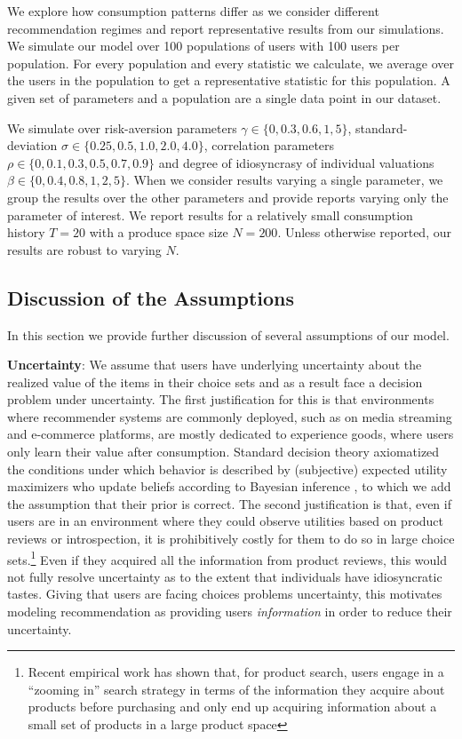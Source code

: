 \documentclass[sigconf]{acmart}
\begin{document}
We explore how consumption patterns differ as we consider different recommendation regimes and report representative results from our simulations. We simulate our model over 100 populations of users with 100 users per population. For every population and every statistic we calculate, we average over the users in the population to get a representative statistic for this population. A given set of parameters and a population are a single data point in our dataset.
\par

We simulate over risk-aversion parameters $\gamma \in \{ 0, 0.3, 0.6, 1, 5 \}$, standard-deviation $\sigma \in \{ 0.25, 0.5, 1.0, 2.0, 4.0 \}$, correlation parameters $\rho\in \{ 0, 0.1, 0.3, 0.5, 0.7, 0.9 \} $ and degree of idiosyncrasy of individual valuations $\beta \in \{ 0, 0.4, 0.8, 1, 2, 5\}$. When we consider results varying a single parameter, we group the results over the other parameters and provide reports varying only the parameter of interest. We report results for a relatively small consumption history $T=20$ with a produce space size $N=200$. Unless otherwise reported, our results are robust to varying $N$.

\subsection{Discussion of the Assumptions}
In this section we provide further discussion of several assumptions of our model.
\par

\noindent \textbf{Uncertainty}: We assume that users have underlying uncertainty about the realized value of the items in their choice sets and as a result face a decision problem under uncertainty. The first justification for this is that environments where recommender systems are commonly deployed, such as on media streaming and e-commerce platforms, are mostly dedicated to experience goods, where users only learn their value after consumption. Standard decision theory axiomatized the conditions under which behavior is described by (subjective) expected utility maximizers \cite{savage1954} who update beliefs according to Bayesian inference \cite{ghirardato2002revisiting}, to which we add the assumption that their prior is correct. The second justification is that, even if users are in an environment where they could observe utilities based on product reviews or introspection, it is prohibitively costly for them to do so in large choice sets.\footnote{Recent empirical work \cite{bronnenberg2014zooming,hodgson2019horse} has shown that, for product search, users engage in a ``zooming in'' search strategy in terms of the information they acquire about products before purchasing and only end up acquiring information about a small set of products in a large product space}  Even if they acquired all the information from product reviews, this would not fully resolve uncertainty as to the extent that individuals have idiosyncratic tastes. Giving that users are facing choices problems uncertainty, this motivates modeling recommendation as providing users \textit{information} in order to reduce their uncertainty.
\par
\end{document}
